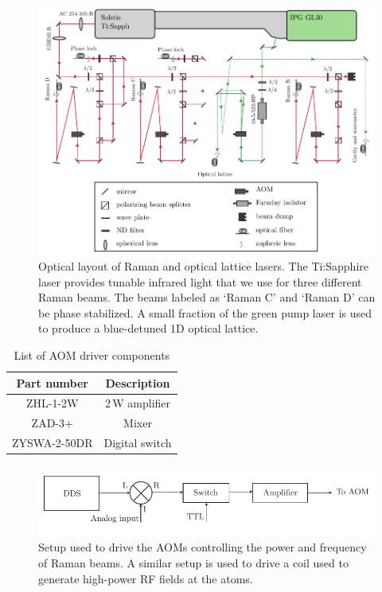 \begin{figure}[htb]
\begin{center}
\includegraphics[]{Figures/Chapter4/Raman_setup.pdf}
\caption[Optical layout of Raman and optical lattice lasers]{Optical layout of Raman and optical lattice lasers. The Ti:Sapphire laser provides tunable infrared light that we use for three different Raman beams. The beams labeled as `Raman C' and `Raman D' can be phase stabilized. A small fraction of the green pump laser is used to produce a blue-detuned 1D optical lattice.}
\label{fig:Raman_setup}
\end{center}
\end{figure}

\begin{table}[h]
\caption[List of AOM driver components]{List of AOM driver components}
\begin{center}
\begin{tabular}{c c}
\hline
Part number & Description \\
\hline \hline
ZHL-1-2W & 2\,W amplifier \\
 ZAD-3+ & Mixer\\
 ZYSWA-2-50DR & Digital switch 
\end{tabular}
\end{center}
\label{table:rf_driver}
\end{table}

\begin{figure}[htb]
\begin{center}
\includegraphics[]{Figures/Chapter4/RF_driver.pdf}
\caption[AOM driving electronics]{Setup used to drive the AOMs controlling the power and frequency of Raman beams. A similar setup is used to drive a coil used to generate high-power RF fields at the atoms.}
\label{fig:RF_driver}
\end{center}
\end{figure}

